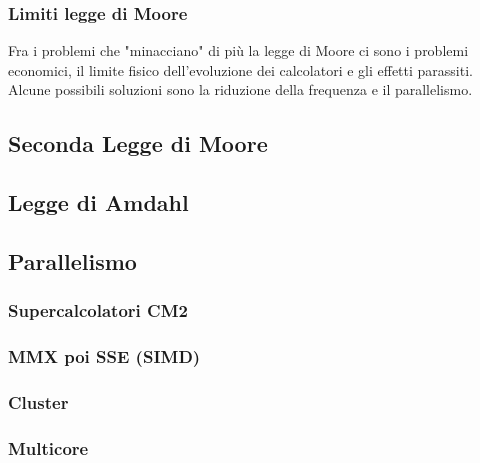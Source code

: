 \documentclass{article}
\begin{document}
	\subsubsection{Limiti legge di Moore}
	Fra i problemi che "minacciano" di più la legge di Moore ci sono i problemi economici, il limite fisico dell'evoluzione dei calcolatori e gli effetti parassiti.\\
	Alcune possibili soluzioni sono la riduzione della frequenza e il parallelismo.
	\subsection{Seconda Legge di Moore}
	\subsection{Legge di Amdahl}
	\subsection{Parallelismo}
	\subsubsection{Supercalcolatori CM2}
	\subsubsection{MMX poi SSE (SIMD)}
	\subsubsection{Cluster}
	\subsubsection{Multicore}
\end{document}
